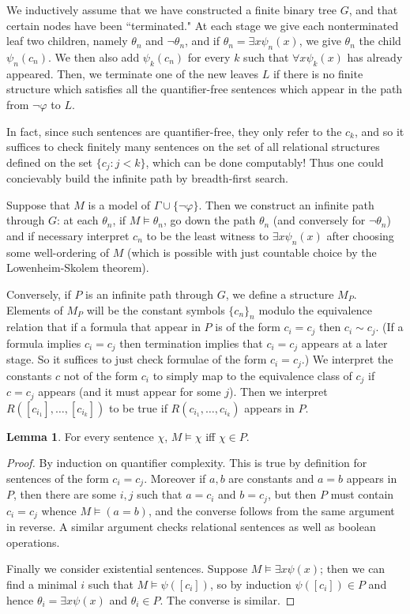 \documentclass[12pt]{report}
\theoremstyle{definition}
\newtheorem{lemma}[theorem]{Lemma}
\begin{document}
We inductively assume that we have constructed a finite binary tree $G$, and that certain nodes have been ``terminated." At each stage we give each nonterminated leaf two children, namely $\theta_n$ and $\neg\theta_n$, and if $\theta_n = \exists x \psi_n(x)$, we give $\theta_n$ the child $\psi_n(c_n)$. We then also add $\psi_k(c_n)$ for every $k$ such that $\forall x \psi_k(x)$ has already appeared. Then, we terminate one of the new leaves $L$ if there is no finite structure which satisfies all the quantifier-free sentences which appear in the path from $\neg\varphi$ to $L$.

In fact, since such sentences are quantifier-free, they only refer to the $c_k$, and so it suffices to check finitely many sentences on the set of all relational structures defined on the set $\{c_j: j < k\}$, which can be done computably! Thus one could concievably build the infinite path by breadth-first search.

Suppose that $M$ is a model of $\Gamma \cup \{\neg\varphi\}$. Then we construct an infinite path through $G$: at each $\theta_n$, if $M \models \theta_n$, go down the path $\theta_n$ (and conversely for $\neg\theta_n$) and if necessary interpret $c_n$ to be the least witness to $\exists x \psi_n(x)$ after choosing some well-ordering of $M$ (which is possible with just countable choice by the Lowenheim-Skolem theorem).

Conversely, if $P$ is an infinite path through $G$, we define a structure $M_P$. Elements of $M_P$ will be the constant symbols $\{c_n\}_n$ modulo the equivalence relation that if a formula that appear in $P$ is of the form $c_i = c_j$ then $c_i \sim c_j$. (If a formula implies $c_i = c_j$ then termination implies that $c_i = c_j$ appears at a later stage. So it suffices to just check formulae of the form $c_i = c_j$.)
We interpret the constants $c$ not of the form $c_i$ to simply map to the equivalence class of $c_j$ if $c = c_j$ appears (and it must appear for some $j$). Then we interpret $R([c_{i_1}], \dots, [c_{i_k}])$ to be true if $R(c_{i_1}, \dots, c_{i_k})$ appears in $P$.

\begin{lemma}
For every sentence $\chi$, $M \models \chi$ iff $\chi \in P$.
\end{lemma}
\begin{proof}
By induction on quantifier complexity. This is true by definition for sentences of the form $c_i = c_j$. Moreover if $a,b$ are constants and $a = b$ appears in $P$, then there are some $i,j$ such that $a = c_i$ and $b = c_j$, but then $P$ must contain $c_i = c_j$ whence $M \models (a=b)$, and the converse follows from the same argument in reverse. A similar argument checks relational sentences as well as boolean operations.

Finally we consider existential sentences. Suppose $M \models \exists x \psi(x)$; then we can find a minimal $i$ such that $M \models \psi([c_i])$, so by induction $\psi([c_i]) \in P$ and hence $\theta_i = \exists x \psi(x)$ and $\theta_i \in P$. The converse is similar.
\end{proof}
\end{document}
